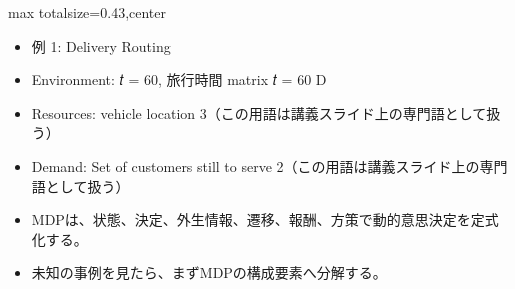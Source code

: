 \clearpage
{}
\begin{minipage}[t]{0.405\textwidth}
\begin{adjustbox}{max totalsize={\textwidth}{0.43\textheight},center}
\begin{minipage}{\textwidth}\scriptsize
{}\begin{itemize}
\item 例 1: Delivery Routing
\item Environment: 𝑡 = 60, 旅行時間 matrix 𝑡 = 60 D
\item Resources: vehicle location 3（この用語は講義スライド上の専門語として扱う）
\item Demand: Set of customers still to serve 2（この用語は講義スライド上の専門語として扱う）
\end{itemize}\begin{itemize}
\item MDPは、状態、決定、外生情報、遷移、報酬、方策で動的意思決定を定式化する。
\item 未知の事例を見たら、まずMDPの構成要素へ分解する。
\end{itemize}
\end{minipage}
\end{adjustbox}
\end{minipage}\hfill
